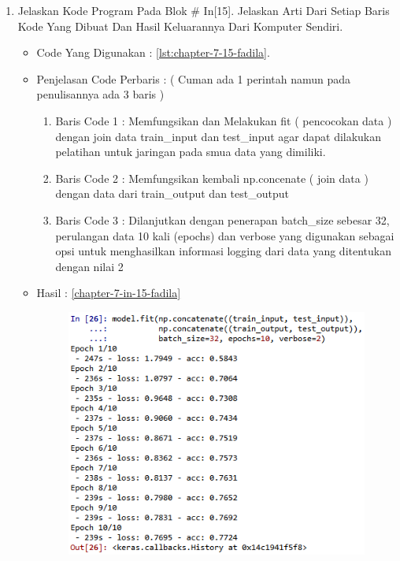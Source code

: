 \begin{enumerate}
\begin{itemize}
\par
\end{itemize}
\par
\par
\par
\item Jelaskan Kode Program Pada Blok \# In[15]. Jelaskan Arti Dari Setiap Baris Kode Yang Dibuat Dan Hasil Keluarannya Dari Komputer Sendiri.
\begin{itemize}
\item Code Yang Digunakan : \ref{lst:chapter-7-15-fadila}.

\par
\par
\item Penjelasan Code Perbaris	: ( Cuman ada 1 perintah namun pada penulisannya ada 3 baris )
\begin{enumerate}
\item Baris Code 1	: Memfungsikan dan Melakukan fit ( pencocokan data ) dengan join data train\_input dan test\_input agar dapat dilakukan pelatihan untuk jaringan pada smua data yang dimiliki.
\item Baris Code 2	: Memfungsikan kembali np.concenate ( join data ) dengan data dari train\_output dan test\_output
\item Baris Code 3	: Dilanjutkan dengan penerapan batch\_size sebesar 32, perulangan data 10 kali (epochs) dan verbose yang digunakan sebagai opsi untuk menghasilkan informasi logging dari data yang ditentukan dengan nilai 2
\end{enumerate}
\par
\par
\item Hasil : \ref{chapter-7-in-15-fadila}
\par
\par
\begin{figure}[!hbtp]
\centering
\includegraphics[scale=0.4]{figures/chapter-7-in-15-fadila.png}

\end{figure}
\end{itemize}
\end{enumerate}

